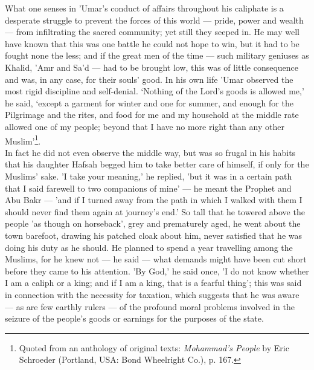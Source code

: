 \documentclass[10pt, twoside,openright]{book}
\begin{document}
What one senses in 'Umar's conduct of affairs throughout his caliphate is a desperate struggle to prevent the forces of this world --- pride, power and wealth --- from infiltrating the sacred community; yet still they seeped in. He may well have known that this was one battle he could not hope to win, but it had to be fought none the less; and if the great men of the time --- such military geniuses as Khalid, 'Amr and Sa'd --- had to be brought low, this was of little consequence and was, in any case, for their souls' good. In his own life 'Umar observed the most rigid discipline and self\hyp{}denial. `Nothing of the Lord's goods is allowed me,' he said, `except a garment for winter and one for summer, and enough for the Pilgrimage and the rites, and food for me and my household at the middle rate allowed one of my people; beyond that I have no more right than any other Muslim'\footnote{Quoted from an anthology of original texts: \emph{Mohammad's People} by Eric Schroeder (Portland, USA: Bond Wheelright Co.), p. 167.}. \\

In fact he did not even observe the middle way, but was so frugal in his habits that his daughter Hafsah begged him to take better care of himself, if only for the Muslims' sake. 'I take your meaning,' he replied, 'but it was in a certain path that I said farewell to two companions of mine' --- he meant the Prophet and Abu Bakr --- 'and if I turned away from the path in which I walked with them I should never find them again at journey's end.' So tall that he towered above the people 'as though on horseback', grey and prematurely aged, he went about the town barefoot, drawing his patched cloak about him, never satisfied that he was doing his duty as he should. He planned to spend a year travelling among the Muslims, for he knew not --- he said --- what demands might have been cut short before they came to his attention. 'By God,' he said once, 'I do not know whether I am a caliph or a king; and if I am a king, that is a fearful thing'; this was said in connection with the necessity for taxation, which suggests that he was aware --- as are few earthly rulers --- of the profound moral problems involved in the seizure of the people's goods or earnings for the purposes of the state. \\
\end{document}
